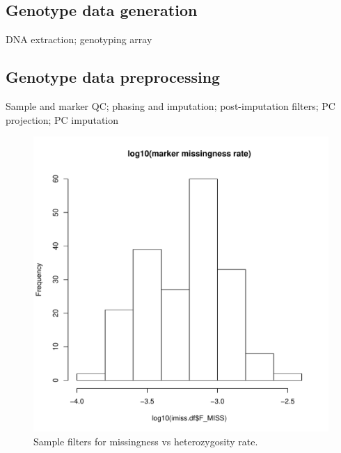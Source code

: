 \subsection{Genotype data generation}

DNA extraction; genotyping array

\subsection{Genotype data preprocessing}

Sample and marker QC; phasing and imputation; post-imputation filters; PC projection; PC imputation

\begin{figure}
    \includegraphics[width=1.0\textwidth,page=2]{./mainmatter/figures/chapter_02/coreex_eQTLflu_20171204.gencall.smajor.impute_sex.qc2.pdf}
    \caption{Sample filters for missingness vs heterozygosity rate.}
\end{figure}


